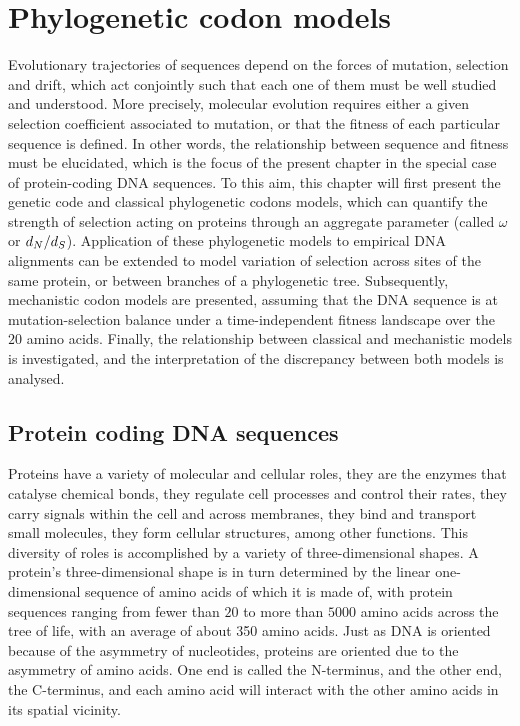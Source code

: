 \chapter{Phylogenetic {codon} models}
{\hypersetup{linkcolor=GREYDARK}\minitoc}
\label{chap:intro-codon-models}
Evolutionary trajectories of sequences depend on the forces of mutation, selection and drift, which act conjointly such that each one of them must be well studied and understood.
More precisely, molecular evolution requires either a given selection coefficient associated to mutation, or that the fitness of each particular sequence is defined.
In other words, the relationship between sequence and fitness must be elucidated, which is the focus of the present chapter in the special case of protein-coding \acrshort{DNA} sequences.
To this aim, this chapter will first present the genetic code and classical phylogenetic codons models, which can quantify the strength of selection acting on proteins through an aggregate parameter (called $\omega$ or $d_N / d_S$).
Application of these phylogenetic models to empirical \acrshort{DNA} alignments can be extended to model variation of selection across sites of the same protein, or between branches of a phylogenetic tree.
Subsequently, mechanistic codon models are presented, assuming that the \acrshort{DNA} sequence is at mutation-selection balance under a time-independent fitness landscape over the $20$ amino acids.
Finally, the relationship between classical and mechanistic models is investigated, and the interpretation of the discrepancy between both models is analysed.


\section{Protein coding {DNA} sequences}
\label{sec-intro:genetic-code}
Proteins have a variety of molecular and cellular roles, they are the enzymes that catalyse chemical bonds, they regulate cell processes and control their rates, they carry signals within the cell and across membranes, they bind and transport small molecules, they form cellular structures, among other functions.
This diversity of roles is accomplished by a variety of three-dimensional shapes.
A protein's three-dimensional shape is in turn determined by the linear one-dimensional sequence of amino acids of which it is made of, with protein sequences ranging from fewer than $20$ to more than $5000$ amino acids across the tree of life, with an average of about 350 amino acids.
Just as \acrshort{DNA} is oriented because of the asymmetry of nucleotides, proteins are oriented due to the asymmetry of amino acids.
One end is called the N-terminus, and the other end, the C-terminus, and each amino acid will interact with the other amino acids in its spatial vicinity.

